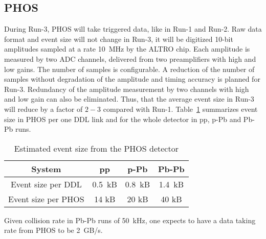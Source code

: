 \subsection{PHOS}
\label{PHOS:datarate}

During Run-3, PHOS will take triggered data, like in Run-1 and
Run-2. Raw data format and event size will not change in Run-3, it
will be digitized 10-bit amplitudes sampled at a rate 10~MHz by the
ALTRO chip. Each amplitude is measured by two ADC channels, delivered
from two preamplifiers with high and low gains. The number of samples
is configurable. A reduction of the number of samples without
degradation of the amplitude and timing accuracy is planned for
Run-3. Redundancy of the amplitude measurement by two channels with
high and low gain can also be eliminated. Thus, that the average event
size in Run-3 will reduce by a factor of $2-3$ compared with
Run-1. Table~\ref{tab:PHOS:eventSize} summarizes event size in PHOS
per one DDL link and for the whole detector in pp, p-Pb and Pb-Pb
runs.
%
\begin{table}[ht]
  \centering
  \begin{tabular}{|c|c|c|c|}\hline
    System              & pp     & p-Pb   & Pb-Pb \\ \hline
    Event size per DDL  & 0.5~kB & 0.8~kB & 1.4~kB \\
    Event size per PHOS & 14 kB  & 20 kB  & 40 kB \\ \hline
  \end{tabular}
  \caption{Estimated event size from the PHOS detector}
  \label{tab:PHOS:eventSize}
\end{table}
%
Given collision rate in Pb-Pb runs of 50~kHz, one expects to have a
data taking rate from PHOS to be 2~GB/s.
